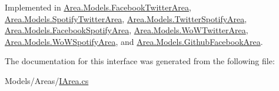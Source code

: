Implemented in \mbox{\hyperlink{classArea_1_1Models_1_1FacebookTwitterArea_a6fd52c3124301206f73b8c9f025872d4}{Area.\+Models.\+Facebook\+Twitter\+Area}}, \mbox{\hyperlink{classArea_1_1Models_1_1SpotifyTwitterArea_ada41191b6c76e9be5677b1e4e175ea23}{Area.\+Models.\+Spotify\+Twitter\+Area}}, \mbox{\hyperlink{classArea_1_1Models_1_1TwitterSpotifyArea_a6ff9d29fc453210f86a59959c89848c4}{Area.\+Models.\+Twitter\+Spotify\+Area}}, \mbox{\hyperlink{classArea_1_1Models_1_1FacebookSpotifyArea_ae574aa239311b4fc84d087adef335f3d}{Area.\+Models.\+Facebook\+Spotify\+Area}}, \mbox{\hyperlink{classArea_1_1Models_1_1WoWTwitterArea_a56856ed9dc553111f0c5db1a4813f565}{Area.\+Models.\+Wo\+W\+Twitter\+Area}}, \mbox{\hyperlink{classArea_1_1Models_1_1WoWSpotifyArea_a2920b3707f791839a3ec17d9ab45f3df}{Area.\+Models.\+Wo\+W\+Spotify\+Area}}, and \mbox{\hyperlink{classArea_1_1Models_1_1GithubFacebookArea_a984d46335dd21d81088312ebe413a0fc}{Area.\+Models.\+Github\+Facebook\+Area}}.



The documentation for this interface was generated from the following file\+:\begin{DoxyCompactItemize}
\item 
Models/\+Areas/\mbox{\hyperlink{IArea_8cs}{I\+Area.\+cs}}\end{DoxyCompactItemize}
